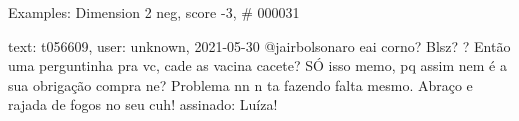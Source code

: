 \begin{frame}{Examples: Dimension 2 neg, score -3, \# 000031}
\footnotesize
\begin{alertblock}{text: t056609, user: unknown, 2021-05-30}
@jairbolsonaro eai corno? Blsz? ? Então uma perguntinha pra vc, cade as vacina 
cacete? SÓ isso memo, pq assim nem é a sua obrigação compra ne? Problema nn n 
ta fazendo falta mesmo. Abraço e rajada de fogos no seu cuh! 
\textbf{} assinado: Luíza! 
\end{alertblock}
\end{frame}
